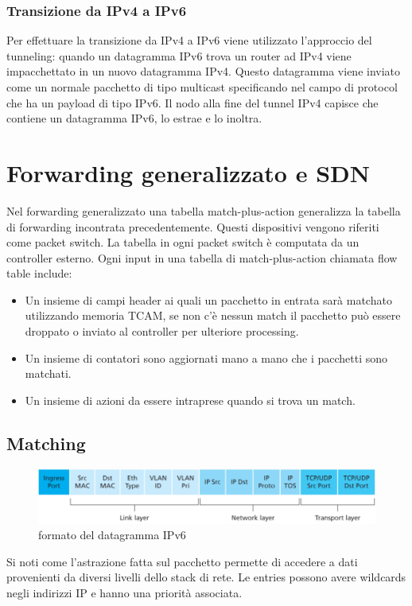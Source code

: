 \subsubsection{Transizione da IPv4 a IPv6}
Per effettuare la transizione da IPv4 a IPv6 viene utilizzato l'approccio del tunneling: quando un datagramma IPv6 trova un router ad IPv4 viene 
impacchettato in un nuovo datagramma IPv4. Questo datagramma viene inviato come un normale pacchetto di tipo multicast specificando nel  campo di protocol che ha un payload di tipo IPv6. Il nodo alla 
fine del tunnel IPv4 capisce che contiene un datagramma IPv6, lo estrae e lo inoltra. 
\section{Forwarding generalizzato e SDN}
Nel forwarding generalizzato una tabella match-plus-action generalizza la tabella di forwarding incontrata precedentemente. Questi dispositivi vengono 
riferiti come packet switch. La tabella in ogni packet switch \`e computata da un controller esterno. Ogni input in una tabella di match-plus-action 
chiamata flow table include:
\begin{itemize}
\item Un insieme di campi header ai quali un pacchetto in entrata sar\`a matchato utilizzando memoria TCAM, se non c'\`e nessun match il pacchetto pu\`o 
essere droppato o inviato al controller per ulteriore processing. 
\item Un insieme di contatori sono aggiornati mano a mano che i pacchetti sono matchati.
\item Un insieme di azioni da essere intraprese quando si trova un match. 
\end{itemize}
\subsection{Matching}
\begin{figure}[h]
\includegraphics[width=\textwidth]{FlowTableEntry.png}
\caption{formato del datagramma IPv6}
\end{figure}
Si noti come l'astrazione fatta sul pacchetto permette di accedere a dati provenienti da diversi livelli dello stack di rete. Le entries possono avere 
wildcards negli indirizzi IP e hanno una priorit\`a associata. 
